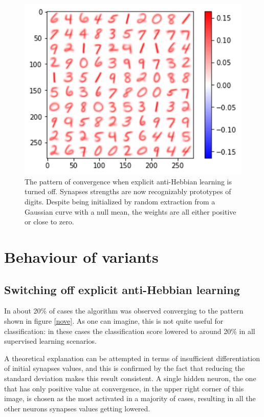 \documentclass[a4paper]{report}
\begin{document}
\begin{figure} [H]
    \centering
    \includegraphics [width=12cm ] {h/nodelta.png}
    \caption{The pattern of convergence when explicit anti-Hebbian learning is turned off. Synapses strengths are now recognizably prototypes of digits. Despite being initialized by random extraction from a Gaussian curve with a null mean, the weights are all either positive or close to zero.}
    \label{nodelta}
\end{figure}

\chapter{Behaviour of variants}

\section{Switching off explicit anti-Hebbian learning}

In about 20\% of cases the algorithm was observed converging to the pattern shown in figure \ref{nove}.
As one can imagine, this is not quite useful for classification:
in these cases the classification score lowered to around 20\% in all supervised learning scenarios.

A theoretical explanation can be attempted in terms of insufficient differentiation of initial synapses values, and this is confirmed by the fact that reducing the standard deviation makes this result consistent.
A single hidden neuron, the one that has only positive value at convergence, in the upper right corner of this image, is chosen as the most activated in a majority of cases, resulting in all the other neurons synapses values getting lowered.
\end{document}
